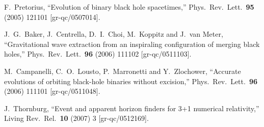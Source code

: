 \documentclass[11pt,a4paper]{article}
\begin{document}
\begin{thebibliography}{99}
  F.~Pretorius,
  ``Evolution of binary black hole spacetimes,''
  Phys.\ Rev.\ Lett.\  {\bf 95} (2005) 121101
  [gr-qc/0507014].

  J.~G.~Baker, J.~Centrella, D.~I.~Choi, M.~Koppitz and J.~van Meter,
  ``Gravitational wave extraction from an inspiraling configuration of merging black holes,''
  Phys.\ Rev.\ Lett.\  {\bf 96} (2006) 111102
  [gr-qc/0511103].
  
  M.~Campanelli, C.~O.~Lousto, P.~Marronetti and Y.~Zlochower,
  ``Accurate evolutions of orbiting black-hole binaries without excision,''
  Phys.\ Rev.\ Lett.\  {\bf 96} (2006) 111101
  [gr-qc/0511048].
  
  J.~Thornburg,
  ``Event and apparent horizon finders for 3+1 numerical relativity,''
  Living Rev.\ Rel.\  {\bf 10} (2007) 3
  [gr-qc/0512169].

\end{thebibliography}
\end{document}
